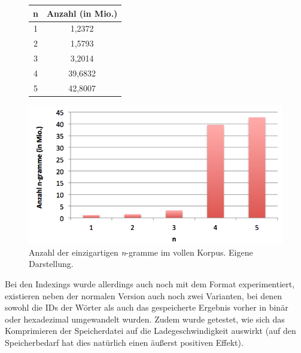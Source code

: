 \documentclass[a4paper,12pt]{scrartcl}
\begin{document}
    \begin{figure}[h]
        \begin{minipage}[t]{0.35\textwidth}
            \centering
            \begin{tabular}{c|c}
                n & Anzahl (in Mio.) \\
                \hline \hline
                1 & 1,2372 \\
                \hline
                2 & 1,5793 \\
                \hline
                3 & 3,2014 \\
                \hline
                4 & 39,6832 \\
                \hline
                5 & 42,8007 \\
            \end{tabular}
        \end{minipage}
        \begin{minipage}{0.65\textwidth}
            \centering
            \includegraphics[width=\textwidth]{./img/ngrams.png}
        \end{minipage}
        \caption{Anzahl der einzigartigen \emph{n}-gramme im vollen Korpus. Eigene Darstellung.}
    \end{figure}

    Bei den Indexings wurde allerdings auch noch mit dem Format experimentiert, existieren neben der normalen Version auch noch zwei Varianten, bei denen sowohl die IDs der Wörter als auch das gespeicherte Ergebnis vorher in binär oder hexadezimal umgewandelt wurden. Zudem wurde getestet, wie sich das Komprimieren der Speicherdatei auf die Ladegeschwindigkeit auswirkt (auf den Speicherbedarf hat dies natürlich einen äußerst positiven Effekt).
\end{document}
